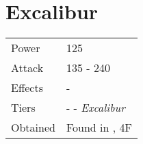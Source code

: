 \section{Excalibur}
\label{weapon:excalibur}


\noindent\begin{tabularx}{\textwidth}[l]{lX}
	Power
	& 125
\\
	Attack
	& 135 - 240
\\
	Effects
	& -
\\
	Tiers
	& \nameref{weapon:steel_sword} - \nameref{weapon:knights_sword} - \textit{Excalibur}
\\
	Obtained
	& Found in \nameref{map:pazuzus_tower}, 4F
\end{tabularx}
